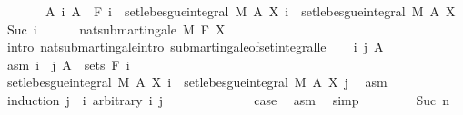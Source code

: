 \begin{isabellebody}
\ \ \ \ \ \ \ {\isachardoublequoteopen}{\isasymAnd}A\ i{\isachardot}{\kern0pt}\ A\ {\isasymin}\ F\ i\ {\isasymLongrightarrow}\ set{\isacharunderscore}{\kern0pt}lebesgue{\isacharunderscore}{\kern0pt}integral\ M\ A\ {\isacharparenleft}{\kern0pt}X\ i{\isacharparenright}{\kern0pt}\ {\isasymle}\ set{\isacharunderscore}{\kern0pt}lebesgue{\isacharunderscore}{\kern0pt}integral\ M\ A\ {\isacharparenleft}{\kern0pt}X\ {\isacharparenleft}{\kern0pt}Suc\ i{\isacharparenright}{\kern0pt}{\isacharparenright}{\kern0pt}{\isachardoublequoteclose}\ \isanewline
\ \ \ \ \ {\isachardoublequoteopen}nat{\isacharunderscore}{\kern0pt}submartingale\ M\ F\ X{\isachardoublequoteclose}\isanewline
%
\isadelimproof
%
\endisadelimproof
%
\isatagproof
{}\isamarkupfalse%
\ {\isacharparenleft}{\kern0pt}intro\ nat{\isacharunderscore}{\kern0pt}submartingale{\isachardot}{\kern0pt}intro\ submartingale{\isacharunderscore}{\kern0pt}of{\isacharunderscore}{\kern0pt}set{\isacharunderscore}{\kern0pt}integral{\isacharunderscore}{\kern0pt}le{\isacharparenright}{\kern0pt}\isanewline
\ \ \isamarkupfalse%
\ i\ j\ A\ \isamarkupfalse%
\ asm{\isacharcolon}{\kern0pt}\ {\isachardoublequoteopen}i\ {\isasymle}\ j{\isachardoublequoteclose}\ {\isachardoublequoteopen}A\ {\isasymin}\ sets\ {\isacharparenleft}{\kern0pt}F\ i{\isacharparenright}{\kern0pt}{\isachardoublequoteclose}\isanewline
\ \ \isamarkupfalse%
\ {\isachardoublequoteopen}set{\isacharunderscore}{\kern0pt}lebesgue{\isacharunderscore}{\kern0pt}integral\ M\ A\ {\isacharparenleft}{\kern0pt}X\ i{\isacharparenright}{\kern0pt}\ {\isasymle}\ set{\isacharunderscore}{\kern0pt}lebesgue{\isacharunderscore}{\kern0pt}integral\ M\ A\ {\isacharparenleft}{\kern0pt}X\ j{\isacharparenright}{\kern0pt}{\isachardoublequoteclose}\ \isamarkupfalse%
\ asm\isanewline
\ \ \isamarkupfalse%
\ {\isacharparenleft}{\kern0pt}induction\ {\isachardoublequoteopen}j\ {\isacharminus}{\kern0pt}\ i{\isachardoublequoteclose}\ arbitrary{\isacharcolon}{\kern0pt}\ i\ j{\isacharparenright}{\kern0pt}\isanewline
\ \ \ \ \isamarkupfalse%
\ {}\isanewline
\ \ \ \ \isamarkupfalse%
\ \isamarkupfalse%
\ {\isacharquery}{\kern0pt}case\ \isamarkupfalse%
\ asm\ \isamarkupfalse%
\ simp\isanewline
\ \ \isamarkupfalse%
\isanewline
\ \ \ \ \isamarkupfalse%
\ {\isacharparenleft}{\kern0pt}Suc\ n{\isacharparenright}{\kern0pt}\isanewline
\ \ \ \ \isamarkupfalse%

\end{isabellebody}
